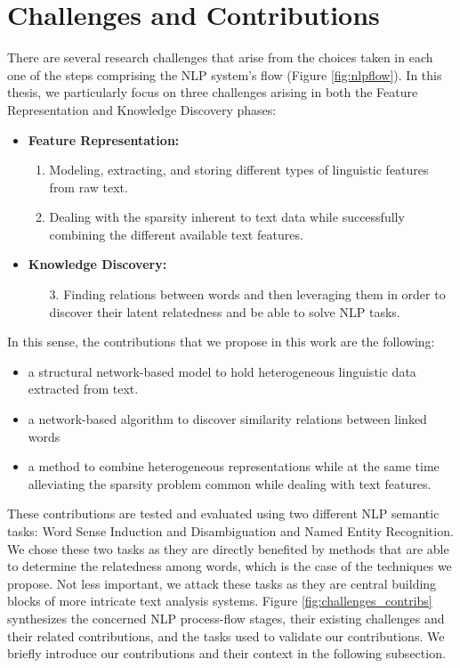 \section{Challenges and Contributions}
There are several research challenges that arise from the choices taken in each one of the steps comprising the NLP system's flow (Figure \ref{fig:nlpflow}).
 In this thesis, we particularly focus on three challenges arising in both the Feature Representation and Knowledge Discovery phases:
\begin{itemize}
 \item \textbf{Feature Representation:}
	 \begin{enumerate}
	 \item  Modeling, extracting, and storing different types of linguistic features from raw text. 
	 \item Dealing with the sparsity inherent to text data while successfully combining the different available text features.
	
	 \end{enumerate}
 \item \textbf{Knowledge Discovery:}
 	\begin{enumerate}
 	\item[3.] Finding relations  between words and then leveraging them in order to discover their latent relatedness and be able to solve NLP tasks.
  	\end{enumerate}
\end{itemize}


In this sense, the contributions that we propose in this work are the following:
\begin{itemize}
\item a structural network-based model to hold heterogeneous linguistic data extracted from text.
\item a network-based algorithm to discover similarity relations between linked words
\item a method to combine heterogeneous representations while at the same time alleviating the sparsity problem common while dealing with text features.
\end{itemize}
These contributions are tested and evaluated using two different NLP semantic tasks: Word Sense Induction and Disambiguation and Named Entity Recognition. We chose these two tasks as they are directly benefited by methods  that are able to determine the relatedness among words, which is the case of the techniques we propose. Not less important, we attack these tasks as they are central building blocks of more intricate text analysis systems.  Figure \ref{fig:challenges_contribs} synthesizes the concerned NLP process-flow stages, their existing challenges and their related contributions, and the tasks used to validate our contributions. We briefly introduce our contributions and their context in the following subsection.

